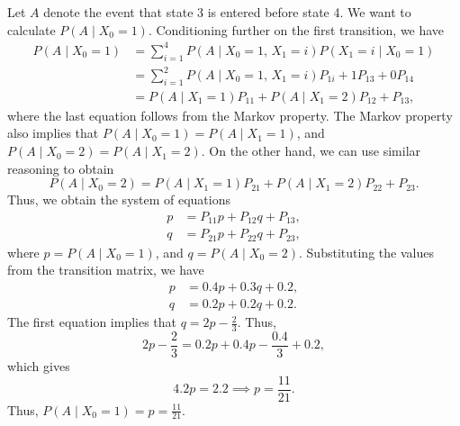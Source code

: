 \documentclass{homework}
\begin{document}
	\begin{alphaparts}
		\questionpart Let $A$ denote the event that state 3 is entered before state 4. We want to calculate $P(A \mid X_0=1)$. Conditioning further on the first transition, we have
		\begin{align*}
			P(A \mid X_0 = 1) &= \sum_{i=1}^4P(A \mid X_0 = 1,\, X_1=i)P(X_1=i\mid X_0=1) \\
			&= \sum_{i=1}^2P(A\mid X_0=1,\, X_1=i) P_{1i} + 1P_{13} + 0P_{14} \\
			&= P(A \mid X_1 = 1)P_{11} + P(A \mid X_1=2)P_{12} + P_{13},
		\end{align*}
		where the last equation follows from the Markov property. The Markov property also implies that $P(A \mid X_0 =1) = P(A\mid X_1=1)$, and $P(A \mid X_0=2) = P(A\mid X_1=2)$. On the other hand, we can use similar reasoning to obtain
		\begin{equation*}
			P(A \mid X_0=2) = P(A\mid X_1=1)P_{21} + P(A \mid X_1=2)P_{22} + P_{23}.
		\end{equation*}
		Thus, we obtain the system of equations
		\begin{align*}
			p &= P_{11}p + P_{12}q + P_{13},\\
			q &= P_{21}p + P_{22}q + P_{23},
		\end{align*}
		where $p = P(A\mid X_0=1)$, and $q = P(A\mid X_0=2)$. Substituting the values from the transition matrix, we have
		\begin{align*}
			p &= 0.4p + 0.3q + 0.2,\\
			q &= 0.2p + 0.2q + 0.2.
		\end{align*}
		The first equation implies that $q = 2p - \frac{2}{3}$. Thus, 
		\begin{equation*}
			2p-\frac{2}{3} = 0.2p + 0.4p - \frac{0.4}{3} + 0.2,
		\end{equation*}
		which gives
		\begin{equation*}
			4.2p = 2.2 \implies p = \frac{11}{21}.
		\end{equation*}
		Thus, $P(A\mid X_0 =1) = p = \frac{11}{21}$.
		

\end{alphaparts}
\end{document}
